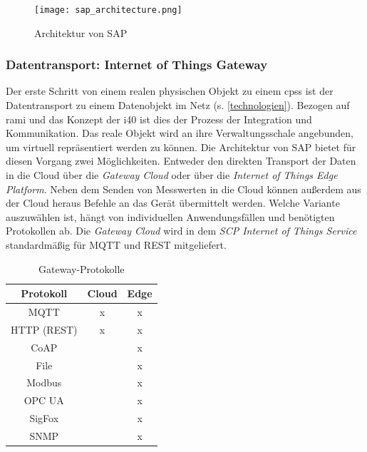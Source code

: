 \begin{figure}[ht!]
  \centering
 \texttt{[image: sap\_architecture.png]}
  \caption[Architektur von SAP]{Architektur von SAP \citep{Ganz2019}}
  \label{saparch}
\end{figure}

\newpage
\subsubsection{Datentransport: Internet of Things Gateway} \label{datentransport}

  Der erste Schritt von einem realen physischen Objekt zu einem \ac{cpss} ist der Datentransport zu einem Datenobjekt im Netz (s. \ref{technologien}). Bezogen auf \ac{rami} und das Konzept der \acf{i40} ist dies der Prozess der Integration und Kommunikation. Das reale Objekt wird an ihre Verwaltungsschale angebunden, um virtuell repräsentiert werden zu können. Die Architektur von SAP bietet für diesen Vorgang zwei Möglichkeiten. Entweder den direkten Transport der Daten in die Cloud über die \textit{Gateway Cloud} oder über die \textit{Internet of Things Edge Platform}. Neben dem Senden von Messwerten in die Cloud können außerdem aus der Cloud heraus Befehle an das Gerät übermittelt werden. Welche Variante auszuwählen ist, hängt von individuellen Anwendungsfällen und benötigten Protokollen ab. Die \textit{Gateway Cloud} wird in dem \textit{SCP Internet of Things Service} standardmäßig für MQTT und REST mitgeliefert.
  
  \begin{table}
    \centering
    \begin{tabular}{ccc}\\\toprule
    Protokoll & Cloud & Edge \\\midrule
    MQTT &x & x\\  \midrule
    HTTP (REST) & x & x\\  \midrule
    CoAP& & x\\  \midrule
    File &  & x\\  \midrule
    Modbus & & x\\  \midrule
    OPC UA & & x\\  \midrule
    SigFox & & x\\  \midrule
    SNMP & & x\\  \bottomrule
    \end{tabular}
    \label{protocol}
    \caption{Gateway-Protokolle}\label{gateway}
  \end{table}
 
